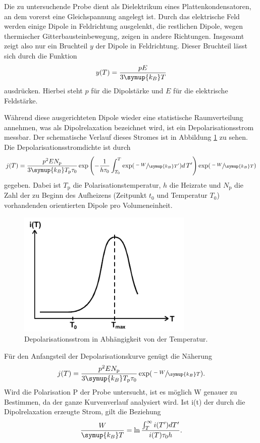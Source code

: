 Die zu untersuchende Probe dient als Dielektrikum eines Plattenkondensatoren, an dem vorerst eine Gleichspannung angelegt ist.
Durch das elektrische Feld werden einige Dipole in Feldrichtung ausgelenkt, die restlichen Dipole, wegen thermischer Gitterbausteinbewegung, zeigen
in andere Richtungen. Insgesamt zeigt also nur ein Bruchteil $y$ der Dipole in Feldrichtung.
Dieser Bruchteil lässt sich durch die Funktion
\begin{equation}
    y(T)=\frac{pE}{3\symup{k_B}T}
\end{equation}
ausdrücken.
Hierbei steht $p$ für die Dipolstärke und $E$ für die elektrische Feldstärke.

Während diese ausgerichteten Dipole wieder eine statistische Raumverteilung annehmen, was als Dipolrelaxation bezeichnet wird, ist ein Depolarisationsstrom messbar.
Der schematische Verlauf dieses Stromes ist in Abbildung \ref{fig:Strom} zu sehen.
Die Depolarisationsstromdichte ist durch
\begin{equation}
\label{eqn:Stromdichte}
    j(T)=\frac{p^2 E N_\text{p}}{3 \symup{k_B} T_\text{p}\tau_0}\exp\left(-\frac{1}{h\tau_0}\int_{T_0}^{T}\exp(\sfrac{-W}{\symup{k_B}T'})d\,T'\right)\exp(\sfrac{-W}{\symup{k_B}T})
\end{equation}
gegeben.
Dabei ist $T_\text{p}$ die Polarisationstemperatur, $h$ die Heizrate und $N_\text{p}$ die Zahl der zu Beginn des Aufheizens (Zeitpunkt $t_0$ und Temperatur $T_0$) vorhandenden orientierten Dipole pro Volumeneinheit.
\begin{figure}[htb]
    \centering
    \includegraphics[height=6cm]{pics/Strom.png}
    \caption{Depolarisationsstrom in Abhängigkeit von der Temperatur. \cite{anleitung}}
    \label{fig:Strom}
\end{figure}
\FloatBarrier
Für den Anfangsteil der Depolarisationskurve genügt die Näherung
\begin{equation}
    j(T)=\frac{p^2 E N_\text{p}}{3 \symup{k_B} T_\text{p}\tau_0}\exp(\sfrac{-W}{\symup{k_B}T}).    
\end{equation}
Wird die Polarisation P der Probe untersucht, ist es möglich W genauer zu Bestimmen, da der ganze Kurvenverlauf analysiert wird.
Ist i(t) der durch die Dipolrelaxation erzeugte Strom, gilt die Beziehung
\begin{equation}
    \frac{W}{\symup{k_B}T}=\ln\frac{\int_T^\infty i(T')dT'}{i(T)\tau_0 h}.
\end{equation}

